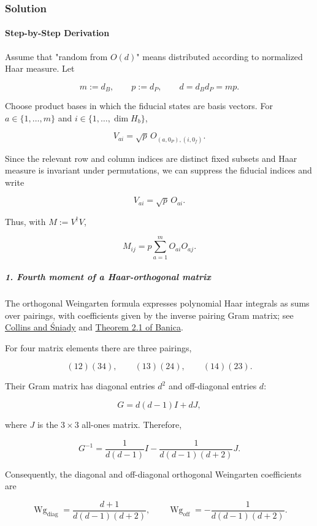 \subsubsection*{Solution}
\paragraph*{Step-by-Step Derivation}

Assume that "random from $O(d)$" means distributed according to normalized Haar measure. Let

\[
m:=d_B,\qquad p:=d_P,\qquad d=d_Bd_P=mp.
\]

Choose product bases in which the fiducial states are basis vectors. For $a\in\{1,\ldots,m\}$ and $i\in\{1,\ldots,\dim H_b\}$,

\[
V_{ai} = \sqrt p\, O_{(a,0_P),(i,0_f)}.
\]

Since the relevant row and column indices are distinct fixed subsets and Haar measure is invariant under permutations, we can suppress the fiducial indices and write

\[
V_{ai}=\sqrt p\,O_{ai}.
\]

Thus, with $M:=V^\dagger V$,

\[
M_{ij} = p\sum_{a=1}^{m}O_{ai}O_{aj}.
\]

\subparagraph*{1. Fourth moment of a Haar-orthogonal matrix}

The orthogonal Weingarten formula expresses polynomial Haar integrals as sums over pairings, with coefficients given by the inverse pairing Gram matrix; see \href{\detokenize{https://arxiv.org/abs/math-ph/0402073}}{Collins and Śniady} and \href{\detokenize{https://arxiv.org/abs/0906.4694}}{Theorem 2.1 of Banica}.

For four matrix elements there are three pairings,

\[
(12)(34),\qquad (13)(24),\qquad (14)(23).
\]

Their Gram matrix has diagonal entries $d^2$ and off-diagonal entries $d$:

\[
G=d(d-1)I+dJ,
\]

where $J$ is the $3\times3$ all-ones matrix. Therefore,

\[
G^{-1} = \frac{1}{d(d-1)}I - \frac{1}{d(d-1)(d+2)}J.
\]

Consequently, the diagonal and off-diagonal orthogonal Weingarten coefficients are

\[
\operatorname{Wg}_{\mathrm{diag}} = \frac{d+1}{d(d-1)(d+2)}, \qquad \operatorname{Wg}_{\mathrm{off}} = -\frac{1}{d(d-1)(d+2)}.
\]

